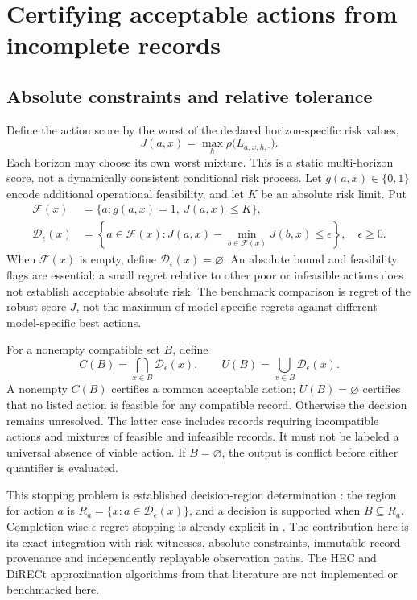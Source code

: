 \documentclass[11pt,a4paper]{article}
\theoremstyle{definition}\newtheorem{definition}[theorem]{Definition}
\begin{document}
\section{Certifying acceptable actions from incomplete records}\label{sec:decisionregions}
\subsection{Absolute constraints and relative tolerance}
Define the action score by the worst of the declared horizon-specific risk values,
\begin{equation}
 J(a,x)=\max_h\rho\bigl(L_{a,x,h,\cdot}\bigr).
 \label{eq:riskscore}
\end{equation}
Each horizon may choose its own worst mixture. This is a static multi-horizon score, not a dynamically consistent conditional risk process. Let $g(a,x)\in\{0,1\}$ encode additional operational feasibility, and let $K$ be an absolute risk limit. Put
\begin{align}
 \mathcal F(x)&=\{a:g(a,x)=1,\ J(a,x)\le K\},\label{eq:feasibleactions}\\
 \mathcal D_\epsilon(x)&=\left\{a\in\mathcal F(x):
 J(a,x)-\min_{b\in\mathcal F(x)}J(b,x)\le\epsilon\right\},\quad\epsilon\ge0.
 \label{eq:acceptableactions}
\end{align}
When $\mathcal F(x)$ is empty, define $\mathcal D_\epsilon(x)=\varnothing$. An absolute bound and feasibility flags are essential: a small regret relative to other poor or infeasible actions does not establish acceptable absolute risk. The benchmark comparison is regret of the robust score $J$, not the maximum of model-specific regrets against different model-specific best actions.

For a nonempty compatible set $B$, define
\begin{equation}
 C(B)=\bigcap_{x\in B}\mathcal D_\epsilon(x),\qquad
 U(B)=\bigcup_{x\in B}\mathcal D_\epsilon(x).
 \label{eq:actionregions}
\end{equation}
A nonempty $C(B)$ certifies a common acceptable action; $U(B)=\varnothing$ certifies that no listed action is feasible for any compatible record. Otherwise the decision remains unresolved. The latter case includes records requiring incompatible actions and mixtures of feasible and infeasible records. It must not be labeled a universal absence of viable action. If $B=\varnothing$, the output is conflict before either quantifier is evaluated.

This stopping problem is established decision-region determination \cite{javdani2014drd}: the region for action $a$ is $R_a=\{x:a\in\mathcal D_\epsilon(x)\}$, and a decision is supported when $B\subseteq R_a$. Completion-wise $\epsilon$-regret stopping is already explicit in \citet{chen2015direct}. The contribution here is its exact integration with risk witnesses, absolute constraints, immutable-record provenance and independently replayable observation paths. The HEC and DiRECt approximation algorithms from that literature are not implemented or benchmarked here.
\end{document}
